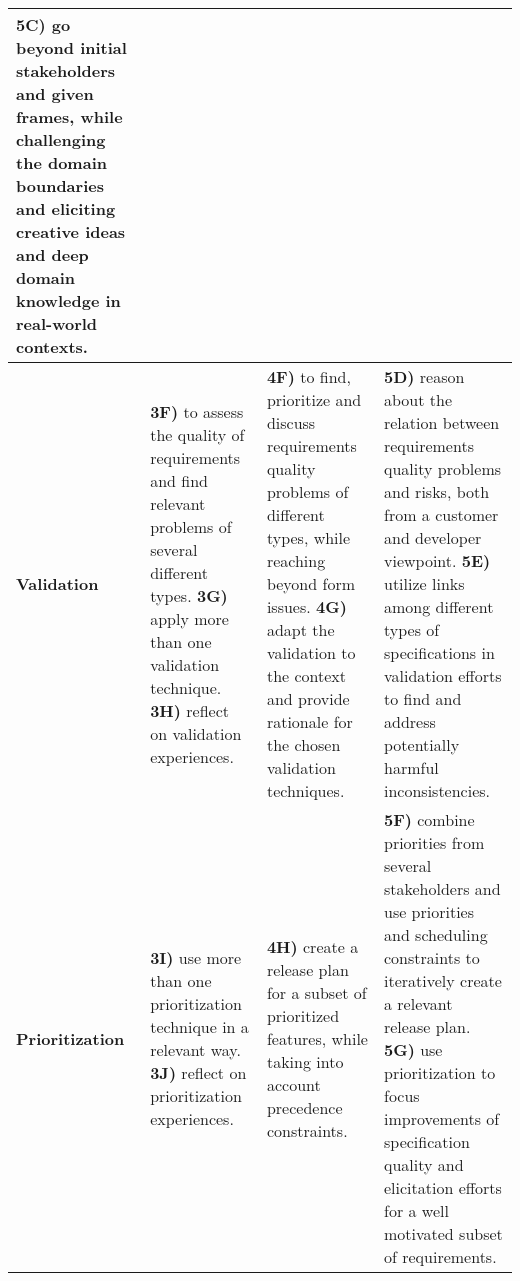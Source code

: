 \documentclass[10pt,a4paper]{article}
\begin{document}
\begin{tabular}{| p{2.3cm} |p{7cm} | p{7cm} | p{7cm} |}
	{\bf 5C)} go beyond initial stakeholders and given frames, while challenging the domain boundaries and eliciting creative ideas and deep domain  knowledge in real-world contexts.
\\ \hline

{\bf Validation}  & 
	
	{\bf 3F)} to assess the quality of requirements and find relevant  problems of several different types. \newline
	{\bf 3G)} apply more than one validation technique. \newline
	{\bf 3H)} reflect on validation experiences.& 
	
	{\bf 4F)} to find, prioritize and discuss requirements quality problems of different types, while reaching beyond form issues. \newline
	{\bf 4G)} adapt the validation to the context and provide rationale for the chosen validation techniques. & 
	
	{\bf 5D)} reason about the relation between requirements quality problems and risks, both from a customer and developer viewpoint. \newline
	{\bf 5E)} utilize links among different types of specifications in validation efforts to find and address potentially harmful inconsistencies. \newline
\\ \hline

{\bf Prioritization}  & 
	
	{\bf 3I)} use more than one prioritization technique in a relevant way. \newline
	{\bf 3J)} reflect on prioritization experiences. &	
	{\bf 4H)} create a release plan for a subset of prioritized features, while taking into account precedence constraints. \newline
& 
	
	{\bf 5F)} combine priorities from several stakeholders and use priorities and scheduling constraints to iteratively create a relevant release plan.\newline	   
	{\bf 5G)} use prioritization to focus improvements of specification quality and elicitation efforts for a well motivated subset of requirements.%
\\ \hline

\end{tabular}
\end{document}
